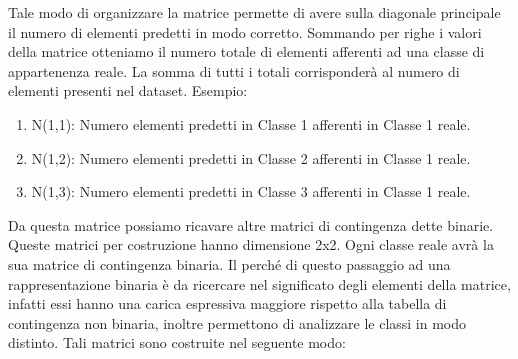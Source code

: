 Tale modo di organizzare la matrice permette di avere sulla diagonale principale il numero di elementi predetti in modo corretto.
Sommando per righe i valori della matrice otteniamo il numero totale di elementi afferenti ad una classe di appartenenza reale.
La somma di tutti i totali corrisponderà al numero di elementi presenti nel dataset.
\newline
Esempio: 
\begin{enumerate}
	\item N(1,1): Numero elementi predetti in Classe 1 afferenti in Classe 1 reale.
	\item N(1,2): Numero elementi predetti in Classe 2 afferenti in Classe 1 reale.
	\item N(1,3): Numero elementi predetti in Classe 3 afferenti in Classe 1 reale.
\end{enumerate}

Da questa matrice possiamo ricavare altre matrici di contingenza dette binarie.
Queste matrici per costruzione hanno dimensione 2x2.
Ogni classe reale avrà la sua matrice di contingenza binaria. Il perché di questo passaggio ad una rappresentazione binaria è da ricercare nel significato degli elementi della matrice, infatti essi hanno una carica espressiva maggiore rispetto alla tabella di contingenza non binaria, inoltre permettono di analizzare le classi in modo distinto.
Tali matrici sono costruite nel seguente modo:

